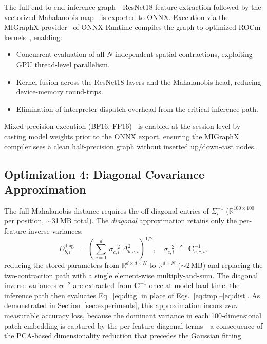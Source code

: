 \documentclass[blind]{gtac}
\begin{document}
The full end-to-end inference graph---ResNet18 feature extraction followed by
the vectorized Mahalanobis map---is exported to ONNX.  Execution via the
MIGraphX provider~\cite{migraphx} of ONNX Runtime compiles the graph to
optimized ROCm kernels~\cite{rocm}, enabling:
%
\begin{itemize}
  \item Concurrent evaluation of all $N$ independent spatial contractions,
    exploiting GPU thread-level parallelism.
  \item Kernel fusion across the ResNet18 layers and the Mahalanobis head,
    reducing device-memory round-trips.
  \item Elimination of interpreter dispatch overhead from the critical
    inference path.
\end{itemize}
%
Mixed-precision execution (BF16, FP16)~\cite{micikevicius2018mixed} is enabled
at the session level by casting model weights prior to the ONNX export, ensuring
the MIGraphX compiler sees a clean half-precision graph without inserted
up/down-cast nodes.

\subsection{Optimization 4: Diagonal Covariance Approximation}

The full Mahalanobis distance requires the off-diagonal entries of
$\Sigma_i^{-1}$ ($\mathbb{R}^{100\times100}$ per position,
$\sim$31\,MB total).  The \emph{diagonal} approximation retains only the
per-feature inverse variances:
%
\begin{equation}
  D^{\mathrm{diag}}_{b,i}
  \;=\; \left(\sum_{c=1}^{d}\,
    \sigma^{-2}_{c,i}\;\Delta_{b,c,i}^{2}
  \right)^{\!\!1/2},
  \quad
  \sigma^{-2}_{c,i} \;\triangleq\; \mathbf{C}^{-1}_{c,c,i},
  \label{eq:diag}
\end{equation}
%
reducing the stored parameters from $\mathbb{R}^{d \times d \times N}$ to
$\mathbb{R}^{d \times N}$ ($\sim$2\,MB) and replacing the two-contraction path
with a single element-wise multiply-and-sum.  The diagonal inverse variances
$\boldsymbol{\sigma}^{-2}$ are extracted from $\mathbf{C}^{-1}$ once at model
load time; the inference path then evaluates Eq.~\eqref{eq:diag} in place of
Eqs.~\eqref{eq:tmp}--\eqref{eq:dist}.  As
demonstrated in Section~\ref{sec:experiments}, this approximation incurs
\emph{zero} measurable accuracy loss, because the dominant variance in each
100-dimensional patch embedding is captured by the per-feature diagonal
terms---a consequence of the PCA-based dimensionality reduction that precedes
the Gaussian fitting.
\end{document}
